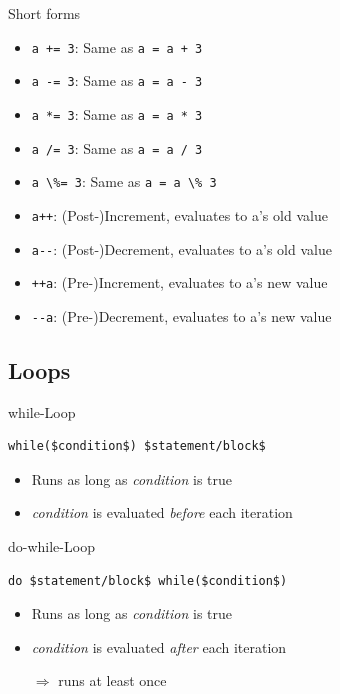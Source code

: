 \documentclass[english,compress]{beamer}
\begin{document}
\begin{frame}{Short forms}
	\begin{itemize}
		\item \lstinline|a += 3|: Same as \lstinline|a = a + 3|
		\item \lstinline|a -= 3|: Same as \lstinline|a = a - 3|
		\item \lstinline|a *= 3|: Same as \lstinline|a = a * 3|
		\item \lstinline|a /= 3|: Same as \lstinline|a = a / 3|
		\item \lstinline|a \%= 3|: Same as \lstinline|a = a \% 3|
		\item \lstinline|a++|: (Post-)Increment, evaluates to a's old value
		\item \lstinline|a--|: (Post-)Decrement, evaluates to a's old value
		\item \lstinline|++a|: (Pre-)Increment, evaluates to a's new value
		\item \lstinline|--a|: (Pre-)Decrement, evaluates to a's new value
	\end{itemize}
\end{frame}

\subsection{Loops}
\begin{frame}[fragile]
	\begin{block}{while-Loop}
		\begin{lstlisting}[numbers=none]
			while($condition$) $statement/block$
		\end{lstlisting}
		\begin{itemize}
			\item Runs as long as \textit{condition} is true
			\item \textit{condition} is evaluated \emph{before} each iteration
		\end{itemize}
	\end{block}
	\begin{block}{do-while-Loop}
		\begin{lstlisting}[numbers=none]
			do $statement/block$ while($condition$)
		\end{lstlisting}
		\begin{itemize}
			\item Runs as long as \textit{condition} is true
			\item \textit{condition} is evaluated \emph{after} each iteration
			\item[$\Rightarrow$] runs at least once
		\end{itemize}
	\end{block}
\end{frame}
\end{document}
